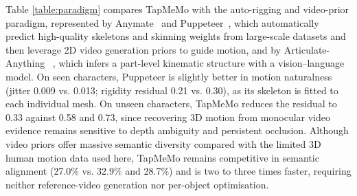 \documentclass[lettersize,journal]{IEEEtran}
\newcommand{\blu}[1]{\texorpdfstring{{\leavevmode\color{blue}#1}}{#1}}
\begin{document}
\blu{Table \ref{table:paradigm} compares TapMeMo with the auto-rigging and video-prior paradigm,
represented by Anymate~\cite{deng2025anymate} and Puppeteer~\cite{song2026puppeteer}, which
automatically predict high-quality skeletons and skinning weights from large-scale datasets and then
leverage 2D video generation priors to guide motion, and by Articulate-Anything
~\cite{le2025articulate}, which infers a part-level kinematic structure with a vision--language model.
On seen characters, Puppeteer is slightly better in motion naturalness (jitter 0.009 vs. 0.013;
rigidity residual 0.21 vs. 0.30), as its skeleton is fitted to each individual mesh. On unseen
characters, TapMeMo reduces the residual to 0.33 against 0.58 and 0.73, since recovering 3D motion
from monocular video evidence remains sensitive to depth ambiguity and persistent occlusion. Although
video priors offer massive semantic diversity compared with the limited 3D human motion data used
here, TapMeMo remains competitive in semantic alignment (27.0\% vs. 32.9\% and 28.7\%) and is two to
three times faster, requiring neither reference-video generation nor per-object optimisation.}
\end{document}
